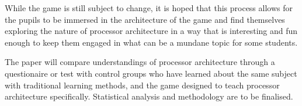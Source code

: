 \documentclass[a4paper]{article}
\begin{document}
While the game is still subject to change, it is hoped that this process allows for the pupils to be immersed in the architecture of the game and find themselves exploring the nature of processor architecture in a way that is interesting and fun enough to keep them engaged in what can be a mundane topic for some students. 

The paper will compare understandings of processor architecture through a questionaire or test with control groups who have learned about the same subject with traditional learning methods, and the game designed to teach processor architecture specifically. Statistical analysis and methodology are to be finalised. 
\end{document}
